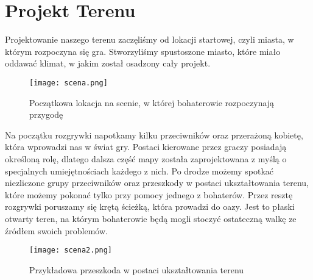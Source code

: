 \section{Projekt Terenu}
Projektowanie naszego terenu zaczęliśmy od lokacji startowej, czyli miasta, w którym rozpoczyna się gra. 
Stworzyliśmy spustoszone miasto, które miało oddawać klimat, w jakim został osadzony cały projekt. 
\begin{figure}[H]
	\center
	\texttt{[image: scena.png]}
	\caption{Początkowa lokacja na scenie, w której bohaterowie rozpoczynają przygodę}
\end{figure}
Na początku rozgrywki napotkamy kilku przeciwników oraz przerażoną kobietę, która wprowadzi nas w świat gry.  
Postaci kierowane przez graczy posiadają określoną rolę, dlatego dalsza część mapy została zaprojektowana z myślą o specjalnych umiejętnościach każdego z nich.
Po drodze możemy spotkać niezliczone grupy przeciwników oraz przeszkody w postaci ukształtowania terenu, które możemy pokonać tylko przy pomocy jednego z bohaterów.
Przez resztę rozgrywki poruszamy się krętą ścieżką, która prowadzi do oazy.
Jest to płaski otwarty teren, na którym bohaterowie będą mogli stoczyć ostateczną walkę ze źródłem swoich problemów.
\begin{figure}[H]
	\center
	\texttt{[image: scena2.png]}
	\caption{Przykładowa przeszkoda w postaci ukształtowania terenu}
\end{figure}